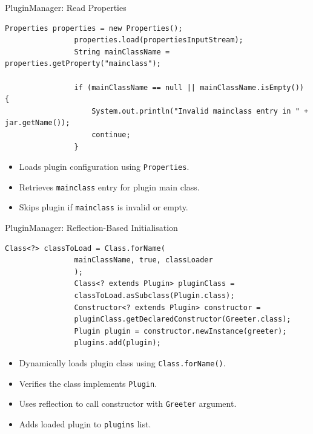 \documentclass[aspectratio=169, table]{beamer}
\begin{document}
		\begin{frame}[fragile]{\LARGE{PluginManager: Read Properties}}
			\vspace{20pt}
			\begin{lstlisting}[style=JavaStyle, inputencoding=utf8, basicstyle=\scriptsize\ttfamily]
				Properties properties = new Properties();
				properties.load(propertiesInputStream);
				String mainClassName = properties.getProperty("mainclass");
				
				if (mainClassName == null || mainClassName.isEmpty()) {
					System.out.println("Invalid mainclass entry in " + jar.getName());
					continue;
				}
			\end{lstlisting}
			
			\begin{itemize}
				\item Loads plugin configuration using \texttt{Properties}.
				\item Retrieves \texttt{mainclass} entry for plugin main class.
				\item Skips plugin if \texttt{mainclass} is invalid or empty.
			\end{itemize}
		\end{frame}
		
		\begin{frame}[fragile]{\LARGE{PluginManager: Reflection-Based Initialisation}}
			\vspace{20pt}
			\begin{lstlisting}[style=JavaStyle, inputencoding=utf8, basicstyle=\scriptsize\ttfamily]
				Class<?> classToLoad = Class.forName(
				mainClassName, true, classLoader
				);
				Class<? extends Plugin> pluginClass =
				classToLoad.asSubclass(Plugin.class);
				Constructor<? extends Plugin> constructor =
				pluginClass.getDeclaredConstructor(Greeter.class);
				Plugin plugin = constructor.newInstance(greeter);
				plugins.add(plugin);
			\end{lstlisting}
			
			\begin{itemize}
				\item Dynamically loads plugin class using \texttt{Class.forName()}.
				\item Verifies the class implements \texttt{Plugin}.
				\item Uses reflection to call constructor with \texttt{Greeter} argument.
				\item Adds loaded plugin to \texttt{plugins} list.
			\end{itemize}
		\end{frame}
		
\end{document}
